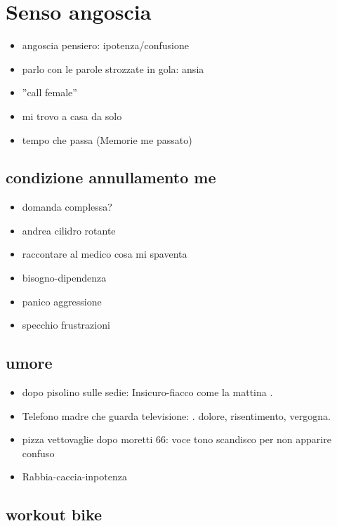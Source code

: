 \section{Senso angoscia}

\begin{itemize}
\item angoscia pensiero: ipotenza/confusione
\item parlo con le parole strozzate in gola: ansia
\item ''call female''
\item mi trovo a casa da solo
\item tempo che passa (Memorie me passato)
\end{itemize}

\subsection{condizione annullamento me}

\begin{itemize}
\item domanda complessa?
\item andrea cilidro rotante
\item raccontare al medico cosa mi spaventa
\item bisogno-dipendenza
\item panico aggressione
\item specchio frustrazioni
\end{itemize}

\subsection{umore}

\begin{itemize}
\item dopo pisolino sulle sedie:
Insicuro-fiacco come la mattina .
\item Telefono madre che guarda televisione: .
dolore, risentimento, vergogna.
\item pizza vettovaglie dopo moretti 66: voce tono scandisco per non apparire confuso
\item Rabbia-caccia-inpotenza
\end{itemize}

\subsection{workout bike}

